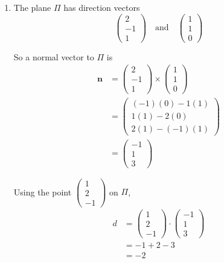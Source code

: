 \documentclass[leqno]{article}
\begin{document}
\begin{enumerate}[
  label=\textbf{\arabic*.},
  leftmargin=*,
  topsep=0pt,
  partopsep=0pt,
  parsep=0pt
]
\begin{tcolorbox}[colback=white, colframe=scarlet, title={\textbf{Solution}}, breakable, grow to left by=6mm, grow to right by=10mm]
\begin{enumerate}[label=\textbf{(\alph*)}]
  \item The plane \(\Pi\) has direction vectors
\[
\begin{pmatrix}2\\-1\\1\end{pmatrix}
\quad \text{and} \quad
\begin{pmatrix}1\\1\\0\end{pmatrix}
\]

So a normal vector to \(\Pi\) is
\begin{align*}
\mathbf n
&=
\begin{pmatrix}2\\-1\\1\end{pmatrix}
\times
\begin{pmatrix}1\\1\\0\end{pmatrix}\\
&=
\begin{pmatrix}
(-1)(0)-1(1)\\
1(1)-2(0)\\
2(1)-(-1)(1)
\end{pmatrix}\\
&=
\begin{pmatrix}-1\\1\\3\end{pmatrix}
\end{align*}

Using the point \(\begin{pmatrix}1\\2\\-1\end{pmatrix}\) on \(\Pi\),
\begin{align*}
d
&=
\begin{pmatrix}1\\2\\-1\end{pmatrix}\cdot
\begin{pmatrix}-1\\1\\3\end{pmatrix}\\
&=-1+2-3\\
&=-2
\end{align*}


\end{enumerate}
\end{tcolorbox}
\end{enumerate}
\end{document}
